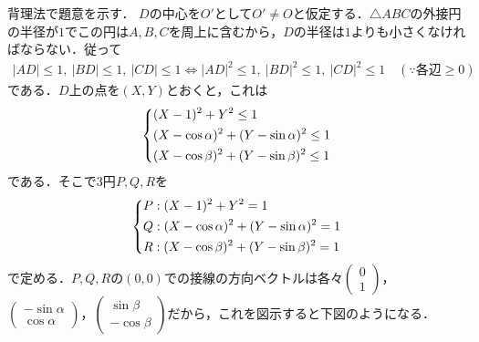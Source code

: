 \documentclass[../../main.tex]{subfiles}
\begin{document}
背理法で題意を示す．
$D$の中心を$O'$として$O'\ne O$と仮定する．$\triangle ABC$の外接円の半径が$1$でこの円は$A,B,C$を周上に含むから，$D$の半径は$1$よりも小さくなければならない．従って
\begin{align}
  |AD|\le1,\ |BD|\le1,\ |CD|\le1 \iff |AD|^2\le1,\ |BD|^2\le1,\ |CD|^2\le1 \quad(\because\text{各辺}\ge0)
\end{align}
である．$D$上の点を$(X,Y)$とおくと，これは
\begin{align}
  \begin{dcases}
    (X-1)^2+Y^2\le1 \\
    (X-\cos\alpha)^2+(Y-\sin\alpha)^2\le1 \\
    (X-\cos\beta)^2+(Y-\sin\beta)^2\le1
  \end{dcases} \label{eq:3}
\end{align}
である．そこで3円$P,Q,R$を
\begin{align}
  \begin{dcases}
    P: (X-1)^2+Y^2=1 \\
    Q: (X-\cos\alpha)^2+(Y-\sin\alpha)^2=1 \\
    R: (X-\cos\beta)^2+(Y-\sin\beta)^2=1
  \end{dcases}
\end{align}
で定める．$P,Q,R$の$(0,0)$での接線の方向ベクトルは各々$
\begin{pmatrix}0\\1
\end{pmatrix}$，$
\begin{pmatrix}-\sin\alpha\\\cos\alpha
\end{pmatrix}$，$
\begin{pmatrix}\sin\beta\\-\cos\beta
\end{pmatrix}$だから，これを図示すると下図のようになる．
\end{document}
